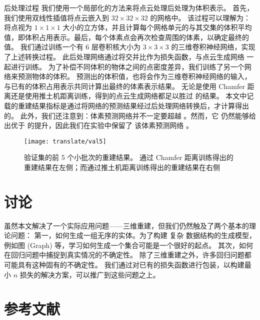 {\heiti 后处理过程}
我们使用一个局部化的方法来将点云处理后处理为体积表示。
首先，我们使用双线性插值将点云嵌入到 $32 \times 32 \times 32$ 的网格中。
该过程可以理解为：将点视为 $1 \times 1 \times 1$ 大小的立方体，并且计算每个网格单元的与其交集的体积平均值，即体积占用表示。最后，每个体素点会再次检查周围的体素，以确定最终的值。
我们通过训练一个有 6 层卷积核大小为 $3 \times 3 \times 3$  的三维卷积神经网络，实现了上述转换过程。
此后处理网络通过将交并比作为损失函数，与点云生成网络 %
一起进行训练。
为了补偿不同体积的物体之间的点密度差异，我们训练了另一个网络来预测物体的体积。
预测出的体积值，也将会作为三维卷积神经网络的输入，与已有的体积占用表示共同计算出最终的体素表示结果。
无论是使用 Chamfer 距离还是使用推土机距离训练，得到的点云生成网络都足以胜过 \threedrsns 的结果。
本文中记载的重建结果指标是通过将网络的预测结果经过后处理网络转换后，才计算得出的。
此外，我们还注意到：体素预测网络并不一定要超越 \threedrsns。然而，它%
仍然能够给出优于 \threedrsns 的提升，因此我们在实验中保留了
该体素预测网络
。

\begin{figure}[!hp]
	\centering
	\texttt{[image: translate/val5]}
	\caption[]{ 验证集的前 5 个小批次的重建结果。
		通过 Chamfer 距离训练得出的重建结果在左侧；而通过推土机距离训练得出的重建结果在右侧}
	\label{fig:translate:val5}
\end{figure}

\section{讨论}
虽然本文解决了一个实际应用问题——三维重建，但我们仍然触及了两个基本的理论问题：
第一，如何生成一组无序的实体。为了构建%
复杂
数据结构的生成模型，例如图 (Graph) 等，学习如何生成一个集合可能是一个很好的起点。 其次，如何在回归问题中捕捉到真实情况的不确定性。 除了三维重建之外，许多回归问题都可能具有这种固有的不确定性。 我们通过对已有的损失函数进行包装，以构建最小 $n$ 损失的解决方案，可以推广到这些问题之上。


\section*{参考文献}


